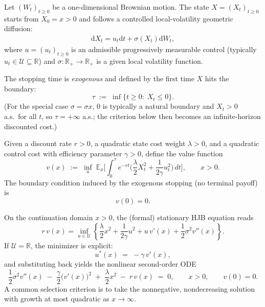 \documentclass[a4paper,10pt]{article}
\newcommand{\dd}{\mathrm{d}}
\theoremstyle{definition}
\theoremstyle{plain}
\numberwithin{equation}{section}
\newcommand{\hs}{\vspace{3mm}}
\begin{document}
Let $(W_t)_{t\ge 0}$ be a one-dimensional Brownian motion. The state $X=(X_t)_{t\ge 0}$ starts from
$X_0=x>0$ and follows a controlled local-volatility geometric diffusion:
\begin{align*}\label{eq:ND-X-dyn}
\dd X_t = u_t \dd t  +  \sigma(X_t)\dd W_t,
\end{align*}
where $u=(u_t)_{t\ge 0}$ is an admissible progressively measurable control (typically $u_t\in\mathcal U\subseteq\mathbb R$)
and $\sigma:\mathbb R_+\to\mathbb R_+$ is a given local volatility function.

The stopping time is \emph{exogenous} and defined by the first time $X$ hits the boundary:
\begin{equation}
\label{eq:ND-tau}
\tau \;:=\; \inf\{t\ge 0:\; X_t \le 0\}.
\end{equation}
(For the special case $\sigma=\sigma x$, $0$ is typically a natural boundary and $X_t>0$ a.s.\ for all $t$,
so $\tau=+\infty$ a.s.; the criterion below then becomes an infinite-horizon discounted cost.)

\hs

Given a discount rate $r>0$, a quadratic state cost weight $\lambda>0$, and a quadratic control cost with
efficiency parameter $\gamma>0$, define the value function
\begin{equation}
\label{eq:ND-value}
v(x)
\;:=\;
\inf_{u}\;
\mathbb E_x\Big[
\int_0^\tau e^{-rt}
\Big(
\frac{\lambda}{2}X_t^2
+
\frac{1}{2\gamma}u_t^2
\Big)\,dt
\Big],
\qquad x>0.
\end{equation}
The boundary condition induced by the exogenous stopping (no terminal payoff) is
\begin{equation}
\label{eq:ND-boundary}
v(0)=0.
\end{equation}

\hs

On the continuation domain $x>0$, the (formal) stationary HJB equation reads
\begin{equation}
\label{eq:ND-HJB}
r\,v(x)
=
\inf_{u\in\mathcal U}
\left\{
\frac{\lambda}{2}x^2
+
\frac{1}{2\gamma}u^2
+
u\,v'(x)
+
\frac{1}{2}\sigma^2 v''(x)
\right\}.
\end{equation}
If $\mathcal U=\mathbb R$, the minimizer is explicit:
\begin{equation}
\label{eq:ND-u-star}
u^*(x) \;=\; -\gamma\,v'(x),
\end{equation}
and substituting back yields the nonlinear second-order ODE
\begin{equation}
\label{eq:ND-ODE-general}
\frac{1}{2}\sigma^2 v''(x)
\;-\;
\frac{\gamma}{2}\big(v'(x)\big)^2
\;+\;
\frac{\lambda}{2}x^2
\;-\;
r\,v(x)
\;=\;0,
\qquad x>0,
\qquad v(0)=0.
\end{equation}
A common selection criterion is to take the nonnegative, nondecreasing solution with growth at most quadratic
as $x\to\infty$.
\end{document}
